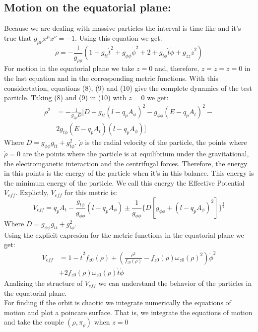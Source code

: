 \documentclass[%
 reprint,
 amsmath,amssymb,
 aps,
]{revtex4-1}
\begin{document}
\subsection{\label{sec:level2}Motion on the equatorial plane:}
Because we are dealing with massive particles the interval is time-like and it's true that $g_{\mu\nu}x^\mu x^\nu=-1$. Using this equation we get:
\begin{equation}
\dot{\rho}=-\frac{1}{g_{\rho\rho}}(1-g_{tt}\dot{t}^2+g_{\phi\phi}\dot{\phi}^2+2+g_{t\phi}\dot{t}\dot{\phi}+g_{zz}\dot{z}^2)
\end{equation}
For motion in the equatorial plane we take $z=0$ and, therefore, $z=\dot{z}=\ddot{z}=0$ in the last equation and in the corresponding metric functions. With this considertation, equations (8), (9) and (10) give the complete dynamics of the test particle. Taking (8) and (9) in (10) with $z=0$ we get:
\begin{equation}
\begin{split}
\dot{\rho}^2&=-\frac{1}{g_{\rho\rho}D}[D+g_{tt}(l-q_pA_\phi)^2-g_{\phi\phi}(E-q_pA_t)^2-\\
&2g_{t\phi}(E-q_pA_t)(l-q_pA_\phi)]
\end{split}
\end{equation}
Where $D=g_{\phi\phi}g_{tt}+g_{t\phi}^2$. $\dot{\rho}$ is the radial velocity of the particle, the points where $\dot{\rho}=0$ are the points where the particle is at equilibrium under the gravitational, the electromganetic interaction and the centrifugal forces. Therefore, the energy in this points is the energy of the particle when it's in this balance. This energy is the minimum energy of the particle. We call this energy the Effective Potential $V_{eff}$. Explictly, $V_{eff}$ for this metric is:
\begin{equation}
V_{eff}=q_pA_t-\frac{g_{t\phi}}{g_{\phi\phi}}(l-q_pA_\phi)\pm\frac{1}{g_{\phi\phi}}\{D[g_{\phi\phi}+(l-q_pA_{\phi})^2] \}^{\frac{1}{2}}
\end{equation}
Where $D=g_{\phi\phi}g_{tt}+g_{t\phi}^2$.\\
\vfill\eject
Using the explicit expresion for the metric functions in the equatorial plane we get:
\begin{equation}
\begin{split}
V_{eff}&=1-\dot{t}^2f_{z0}(\rho)+\left( \frac{\rho^2}{f_{z0}(\rho)}-f_{z0}(\rho)\omega_{z0}(\rho)^2 \right)\dot{\phi}^2\\
&+2f_{z0}(\rho)\omega_{z0}(\rho)\dot{t}\dot{\phi}
\end{split}
\end{equation}
Analizing the structure of $V_{eff}$ we can understand the behavior of the particles in the equatorial plane.\\
For finding if the orbit is chaotic we integrate numerically the equations of motion and plot a poincare surface. That is, we integrate the equations of motion and take the couple $(\rho,\pi_\rho)$ when $z=0$ 
\end{document}
